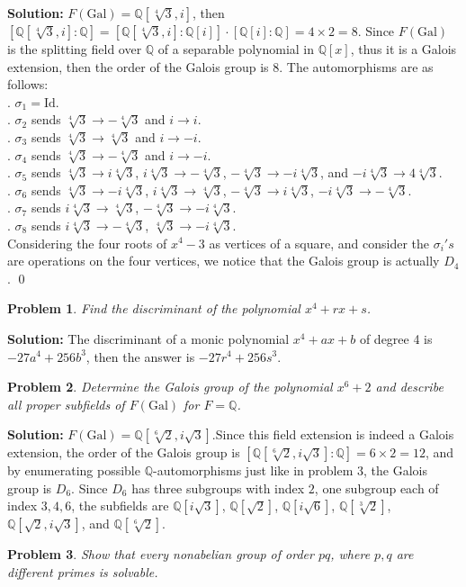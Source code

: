 \documentclass[12pt]{article}
\newtheorem{problem}{Problem}
\begin{document}
\textbf{Solution:} $F(\text{Gal}) = \mathbb{Q}[\sqrt[4]3, i]$, then $[\mathbb{Q}[\sqrt[4]3,i]: \mathbb{Q}]=[\mathbb{Q}[\sqrt[4]3,i]:\mathbb{Q}[i]]\cdot[\mathbb{Q}[i]:\mathbb{Q}]=4\times2=8$. Since $F(\text{Gal})$ is the splitting field over $\mathbb{Q}$ of a separable polynomial in $\mathbb{Q}[x]$, thus it is a Galois extension, then the order of the Galois group is $8$. The automorphisms are as follows: \\
. $\sigma_{1}=\text{Id}$. \\
. $\sigma_{2}$ sends $\sqrt[4]{3}\to-\sqrt[4]{3}$ and $i\to i$. \\
. $\sigma_{3}$ sends $\sqrt[4]{3}\to\sqrt[4]{3}$ and $i\to -i$. \\
. $\sigma_{4}$ sends $\sqrt[4]{3}\to -\sqrt[4]{3}$ and $i\to -i$. \\
. $\sigma_{5}$ sends $\sqrt[4]{3}\to i\sqrt[4]{3}$, $i\sqrt[4]{3}\to-\sqrt[4]{3}$, $-\sqrt[4]{3}\to-i\sqrt[4]{3}$, and $-i\sqrt[4]{3}\to4\sqrt[4]{3}$. \\
. $\sigma_{6}$ sends $\sqrt[4]{3}\to-i\sqrt[4]{3}$, $i\sqrt[4]{3}\to\sqrt[4]{3}$, $-\sqrt[4]{3}\to i\sqrt[4]{3}$, $-i\sqrt[4]{3}\to-\sqrt[4]{3}$.\\
. $\sigma_{7}$ sends $i\sqrt[4]{3}\to\sqrt[4]{3}$, $-\sqrt[4]{3}\to-i\sqrt[4]{3}$.\\
. $\sigma_{8}$ sends $i\sqrt[4]{3}\to-\sqrt[4]{3}$, $\sqrt[4]{3}\to-i\sqrt[4]{3}$.\\
Considering the four roots of $x^4-3$ as vertices of a square, and consider the $\sigma_{i}'s$ are operations on the four vertices, we notice that the Galois group is actually $D_{4}$. \qed
\\
\begin{problem}
Find the discriminant of the polynomial $x^4+rx+s$.
\end{problem} 

\textbf{Solution:} The discriminant of a monic polynomial $x^4+ax+b$ of degree 4 is $-27a^4+256b^3$, then the answer is $-27r^4+256s^3$.
\\
\begin{problem}
Determine the Galois group of the polynomial $x^6+2$ and describe all proper subfields of $F(\text{Gal})$ for $F=\mathbb{Q}$.
\end{problem}

\textbf{Solution:} $F(\text{Gal})=\mathbb{Q}[\sqrt[6]{2}, i\sqrt{3}]. $Since this field extension is indeed a Galois extension, the order of the Galois group is $[\mathbb{Q}[\sqrt[6]{2}, i\sqrt{3}]:\mathbb{Q}]=6\times 2=12$, and by enumerating possible $\mathbb{Q}$-automorphisms just like in problem 3, the Galois group is $D_{6}$. Since $D_{6}$ has three subgroups with index $2$, one subgroup each of index $3, 4, 6$, the subfields are $\mathbb{Q}[i\sqrt{3}]$, $\mathbb{Q}[\sqrt2]$, $\mathbb{Q}[i\sqrt 6]$, $\mathbb{Q}[\sqrt[3]2]$, $\mathbb{Q}[\sqrt{2}, i\sqrt{3}]$, and $\mathbb{Q}[\sqrt[6]2]$.
\\
\begin{problem}
Show that every nonabelian group of order $pq$, where $p,q$ are different primes is solvable.
\end{problem}
\end{document}
